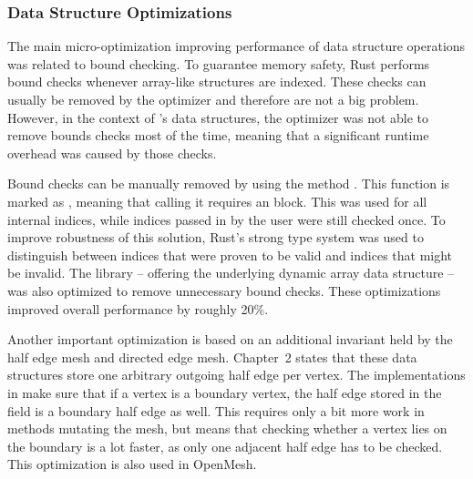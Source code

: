 \vspace{-1mm}
\subsubsection*{Data Structure Optimizations}

The main micro-optimization improving performance of data structure operations was related to bound checking.
To guarantee memory safety, Rust performs bound checks whenever array-like structures are indexed.
These checks can usually be removed by the optimizer and therefore are not a big problem.
However, in the context of 's data structures, the optimizer was not able to remove bounds checks most of the time, meaning that a significant runtime overhead was caused by those checks.

Bound checks can be manually removed by using the method .
This function is marked as , meaning that calling it requires an  block.
This was used for all internal indices, while indices passed in by the user were still checked once.
To improve robustness of this solution, Rust's strong type system was used to distinguish between indices that were proven to be valid and indices that might be invalid.
The library  -- offering the underlying dynamic array data structure -- was also optimized to remove unnecessary bound checks.
These optimizations improved overall performance by roughly 20\%.

Another important optimization is based on an additional invariant held by the half edge mesh and directed edge mesh.
Chapter~2 states that these data structures store one arbitrary outgoing half edge per vertex.
The implementations in  make sure that if a vertex is a boundary vertex, the half edge stored in the  field is a boundary half edge as well.
This requires only a bit more work in methods mutating the mesh, but means that checking whether a vertex lies on the boundary is a lot faster, as only one adjacent half edge has to be checked.
This optimization is also used in OpenMesh.
